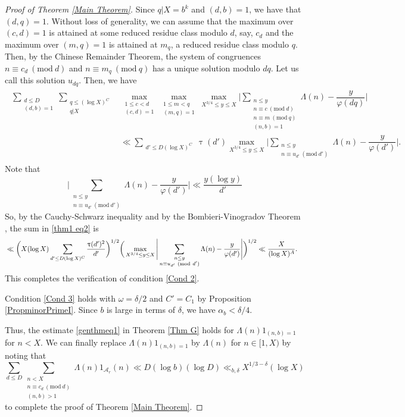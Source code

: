 \documentclass[12pt]{amsart}
\numberwithin{equation}{section}
\theoremstyle{remark}
\theoremstyle{definition}
\newcommand{\imod}[1]{\ (\mathrm{mod}\ #1)}
\begin{document}
\begin{proof}[Proof of Theorem \ref{Main Theorem}]
Since $q|X=b^k$ and $(d, b)=1$, we have that $(d, q)=1$. Without loss of generality, we can assume that the maximum over $(c, d)=1$ is attained at some reduced residue class modulo $d$, say, $c_d$ and the maximum over $(m, q)=1$ is attained at $m_q$, a reduced residue class modulo $q$. Then, by the Chinese Remainder Theorem, the system of congruences $n\equiv c_d\imod d$ and $n\equiv m_q\imod q$ has a unique solution modulo $dq$. Let us call this solution $u_{dq}$. Then, we have
\begin{align}\label{thm1 eq2}
\begin{aligned}
 \sum_{\substack{d\leq D\\(d, b)=1}}\sum_{\substack{q\leq (\log X)^{C}\\q|X}}&\max_{\substack{1\leq c<d\\(c, d)=1}}\max_{\substack{1\leq m<q\\(m, q)=1}}\max_{X^{3/4}\leq y \leq X}\Bigg|\sum_{\substack{n\leq y\\n\equiv c\imod d\\ n\equiv m\imod q\\(n, b)=1} }\Lambda(n)-\dfrac{ y}{\varphi(dq)}\Bigg|\\
 &\ll \sum_{\substack{d'\leq D(\log X)^C}}\uptau(d')\max_{X^{3/4}\leq y \leq X}\Bigg|\sum_{\substack{n\leq y\\n\equiv u_{d'}\imod {d'}} }\Lambda(n)-\dfrac{ y}{\varphi(d')}\Bigg|.
 \end{aligned}
\end{align}
Note that
\[\bigg|\sum_{\substack{n\leq y\\n\equiv u_{d'}\imod {d'}} }\Lambda(n)-\dfrac{ y}{\varphi(d')}\bigg|\ll\dfrac{y(\log y)}{d'}\] 
So, by the Cauchy-Schwarz inequality and by the Bombieri-Vinogradov Theorem \cite[Chapter 28]{dav}, the sum in \eqref{thm1 eq2} is
\begin{align}\notag 
&\ll \bigg(X(\log X)\sum_{d'\leq D(\log X)^C}\dfrac{\uptau(d')^2}{d'}\bigg)^{1/2}\bigg(\max_{X^{3/4}\leq y \leq X}\Bigg|\sum_{\substack{n\leq y\\n\equiv u_{d'}\imod {d'}} }\Lambda(n)-\dfrac{ y}{\varphi(d')}\Bigg|\bigg)^{1/2} \ll \dfrac{X}{(\log X)^A}.
\end{align}
This completes the verification of condition \ref{Cond 2}.


 Condition \ref{Cond 3} holds with $\omega=\delta/2$ and $C'=C_1$ by Proposition \ref{PropminorPrimeI}. Since $b$ is large in terms of $\delta$, we have $\alpha_b < \delta/4$. 

Thus, the estimate \eqref{genthmeq1} in Theorem \ref{Thm G} holds for $\Lambda(n)1_{(n, b)=1}$ for $n<X$. We can finally replace $\Lambda(n)1_{(n, b)=1}$ by $\Lambda(n)$ for $n\in [1, X)$ by noting that 
\[\sum_{d\leq D}\sum_{\substack{n<X\\ n\equiv c_d\imod d\\(n, b)>1}}\Lambda(n)1_{\mathcal{A}_r}(n) \ll D(\log b)(\log D) \ll_{b, \delta} X^{1/3-\delta}(\log X)\] to complete the proof of Theorem \ref{Main Theorem}.

\end{proof}
\end{document}
